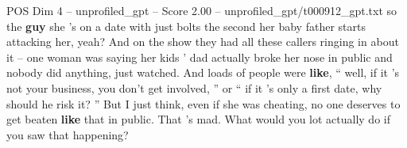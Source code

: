 \begin{textsample}{POS Dim 4 – unprofiled\_gpt – Score 2.00 – unprofiled\_gpt/t000912\_gpt.txt}  \label{ex:f4_pos_026}
so the \textbf{guy} she 's on a date with just bolts the second her baby father starts attacking her, yeah?
And on the show they had all these callers ringing in about it – one woman was saying her kids ’ dad actually broke her nose in public and nobody did anything, just watched.
And loads of people were \textbf{like}, “ well, if it ’s not your business, you don't get involved, ” or “ if it ’s only a first date, why should he risk it? ” But I just think, even if she was cheating, no one deserves to get beaten \textbf{like} that in public.
That ’s mad.
What would you lot actually do if you saw that happening?

\end{textsample}
